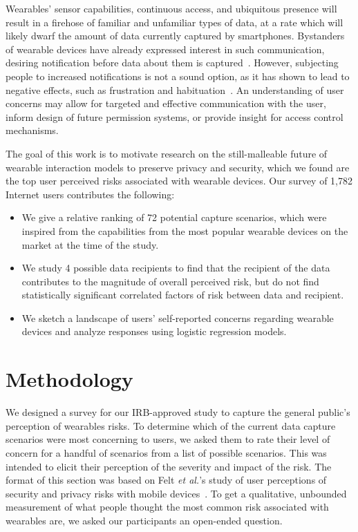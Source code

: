 \documentclass[conference]{IEEEtran}
\begin{document}
Wearables' sensor capabilities, continuous access, and ubiquitous presence will result in a firehose of familiar and unfamiliar types of data, at a rate which will likely dwarf the amount of data currently captured by smartphones. Bystanders of wearable devices have already expressed interest in such communication, desiring notification before data about them is captured~\cite{denning2014situ}. However, subjecting people to increased notifications is not a sound option, as it has shown to lead to negative effects, such as frustration and habituation~\cite{bohme2011security}. An understanding of user concerns may allow for targeted and effective communication with the user, inform design of future permission systems, or provide insight for access control mechanisms. 

The goal of this work is to motivate research on the still-malleable future of wearable interaction models to preserve privacy and security, which we found are the top user perceived risks associated with wearable devices.  Our survey of 1,782 Internet users contributes the following: %

\begin{itemize} \itemsep1pt \parskip0pt 
\item We give a relative ranking of 72 potential capture scenarios, which were inspired from the capabilities from the most popular wearable devices on the market at the time of the study. 
\item We study 4 possible data recipients to find that the recipient of the data contributes to the magnitude of overall perceived risk, but do not find statistically significant correlated factors of risk between data and recipient. 
\item We sketch a landscape of users' self-reported concerns regarding wearable devices and analyze responses using logistic regression models. 
\end{itemize}

\section{Methodology}
We designed a survey for our IRB-approved study to capture the general public's perception of wearables risks. To determine which of the current data capture scenarios were most concerning to users, we asked them to rate their level of concern for a handful of scenarios from a list of possible scenarios. This was intended to elicit their perception of the severity and impact of the risk. The format of this section was based on Felt {\it et al.}'s study of user perceptions of security and privacy risks with mobile devices~\cite{Felt}. To get a qualitative, unbounded measurement of what people thought the most common risk associated with wearables are, we asked our participants an open-ended question. 
\end{document}
